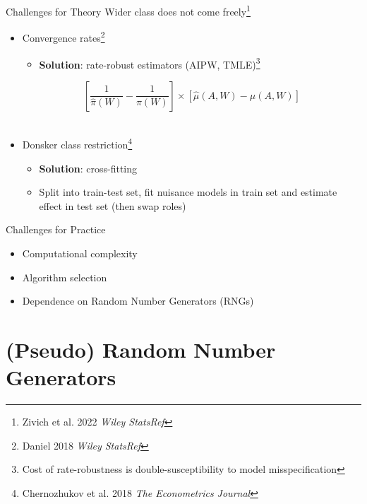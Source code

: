 \documentclass{beamer}
\begin{document}
\begin{frame}{Challenges for Theory}
	Wider class does not come freely\footnote[frame]{Zivich et al. 2022 \textit{Wiley StatsRef}}
	\begin{itemize}
		\item[1.] Convergence rates\footnote[frame]{Daniel 2018 \textit{Wiley StatsRef}}
		\begin{itemize}
			\item \textbf{Solution}: rate-robust estimators (AIPW, TMLE)\footnote[frame]{Cost of rate-robustness is double-susceptibility to model misspecification}
		\end{itemize}
		\begin{equation*}
			\left[ \frac{1}{\hat{\pi}(W)} - \frac{1}{\pi(W)} \right] \times \left[ \hat{\mu}(A,W) - \mu(A,W) \right]
		\end{equation*}
		~\\
		\item[2.] Donsker class restriction\footnote[frame]{Chernozhukov et al. 2018 \textit{The Econometrics Journal}}
		\begin{itemize}
			\item \textbf{Solution}: cross-fitting
			\item Split into train-test set, fit nuisance models in train set and estimate effect in test set (then swap roles)
		\end{itemize}
	\end{itemize}
\end{frame}

\begin{frame}{Challenges for Practice}
	\begin{itemize}
		\item[1.] Computational complexity
		\item[2.] Algorithm selection
		\item[3.] Dependence on Random Number Generators (RNGs)
	\end{itemize}
\end{frame}

\section{(Pseudo) Random Number Generators}
\end{document}
